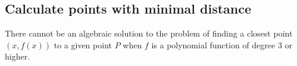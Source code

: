 \documentclass[a4paper]{scrartcl}
\theoremstyle{break}
\theoremstyle{nonumberplain}
\begin{document}
%
%
%
%

\subsection{Calculate points with minimal distance}
\begin{theorem}
    There cannot be an algebraic solution to the problem of finding 
    a closest point $(x, f(x))$ to a given point $P$ when $f$ is
    a polynomial function of degree $3$ or higher.
\end{theorem}
\end{document}
